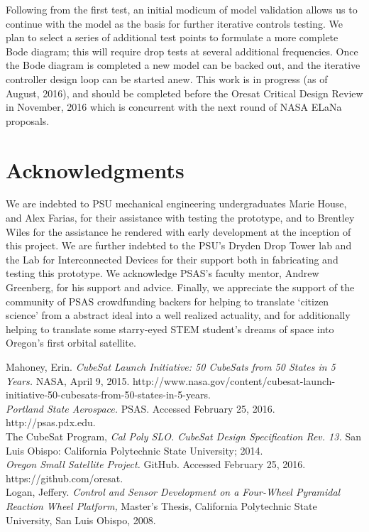 \documentclass[]{aiaa-tc}%
\begin{document}
Following from the first test, an initial modicum of model validation allows us to continue with the model as the basis for further iterative controls testing. We plan to select a series of additional test points to formulate a more complete Bode diagram; this will require drop tests at several additional frequencies. Once the Bode diagram is completed a new model can be backed out, and the iterative controller design loop can be started anew. This work is in progress (as of August, 2016), and should be completed before the Oresat Critical Design Review in November, 2016 which is concurrent with the next round of NASA ELaNa proposals.

\section{Acknowledgments}
We are indebted to PSU mechanical engineering undergraduates Marie House, and Alex Farias, for their assistance with testing the prototype, and to Brentley Wiles for the assistance he rendered with early development at the inception of this project. We are further indebted to the PSU's Dryden Drop Tower lab and the Lab for Interconnected Devices for their support both in fabricating and testing this prototype. We acknowledge PSAS's faculty mentor, Andrew Greenberg, for his support and advice. Finally, we appreciate the support of the community of PSAS crowdfunding backers for helping to translate `citizen science' from a abstract ideal into a well realized actuality, and for additionally helping to translate some starry-eyed STEM student's dreams of space into Oregon's first orbital satellite.

\begin{thebibliography}{9}%

Mahoney, Erin. {\it CubeSat Launch Initiative: 50 CubeSats from 50 States in 5 Years.} NASA, April 9, 2015. http://www.nasa.gov/content/cubesat-launch-initiative-50-cubesats-from-50-states-in-5-years.\\

{\it Portland State Aerospace.} PSAS. Accessed February 25, 2016. http://psas.pdx.edu.\\

The CubeSat Program, {\it Cal Poly SLO. CubeSat Design Specification Rev. 13.} San Luis
Obispo: California Polytechnic State University; 2014.\\

{\it Oregon Small Satellite Project.} GitHub. Accessed February 25, 2016. https://github.com/oresat.\\

Logan, Jeffery. {\it Control and Sensor Development on a Four-Wheel Pyramidal Reaction Wheel Platform,} Master’s Thesis, California Polytechnic State University, San Luis Obispo, 2008.\\


\end{thebibliography}
\end{document}
